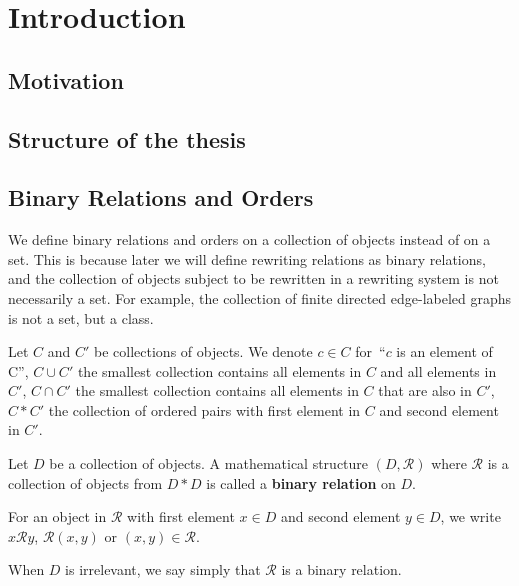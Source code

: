 \documentclass{book}
\begin{document}
  
  
  
 
\tableofcontents  
\newpage     
     
\part{Introduction} 
\chapter{Motivation}
 
\chapter{Structure of the thesis}
 

\chapter{Binary Relations and Orders}  

We define binary relations and orders on a collection of objects instead of on a set. This is because later we will define rewriting relations as binary relations, and the collection of objects subject to be rewritten in a rewriting system is not necessarily a set. For example, the collection of finite directed edge-labeled graphs is not a set, but a class.

\begin{notation}
    Let $C$ and $C'$ be collections of objects. We denote $c \mathop{\in} C$ for~\enquote{$c$ is an element of C}, $C \mathop{\cup} C'$ the smallest collection contains all elements in $C$ and all elements in $C'$, $C \mathop{\cap} C'$ the smallest collection contains all elements in $C$ that are also in $C'$, $C * C'$ the collection of ordered pairs with first element in $C$ and second element in $C'$.  
  \end{notation} 
  
  \begin{definition}
    \label{def:binary_relation:binary_relation}
    Let $D$ be a collection of objects. A mathematical structure \( (D, \mathcal{R}) \) where $\mathcal{R}$ is a collection of objects from $D * D$ is called a \textbf{binary relation} on $D$. 
    
    For an object in $\mathcal{R}$ with first element $x \mathop{\in} D$ and second element $y\in D$, we write $x \mathcal{R} y$, $\mathcal{R}(x,y)$ or $(x,y) \mathop{\in} \mathcal{R}$. 
    
    When $D$ is irrelevant, we say simply that $\mathcal{R}$ is a binary relation.
  \end{definition} 
   
\end{document}
